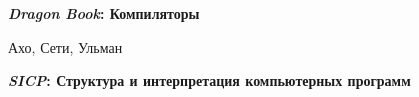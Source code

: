 \begin{thebibliography}{99}

 \textbf{\emph{Dragon Book}: Компиляторы}

Ахо, Сети, Ульман

 \textbf{\emph{SICP}: Структура и интерпретация компьютерных
программ}

\end{thebibliography}